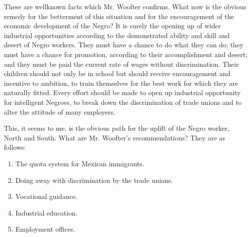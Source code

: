 \documentclass[letterpaper,10pt,english]{jupyterBook}
\begin{document}
\sphinxAtStartPar
These are well\sphinxhyphen{}known facts which Mr. Woofter confirms. What now is the obvious remedy for the betterment of this situation and for the encouragement of the economic development of the Negro? It is surely the opening up of wider industrial opportunities according to the demonstrated ability and skill and desert of Negro workers. They must have a chance to do what they can do; they must have a chance for promotion, according to their accomplishment and desert; and they must be paid the current rate of wages without discrimination. Their children should not only be in school but should receive encouragement and incentive to ambition, to train themselves for the best work for which they are naturally fitted. Every effort should be made to open up industrial opportunity for intelligent Negroes, to break down the discrimination of trade unions and to alter the attitude of many employers.

\sphinxAtStartPar
This, it seems to me, is the obvious path for the uplift of the Negro worker, North and South. What are Mr. Woofter’s recommendations? They are as follows:
\begin{enumerate}
%
\item {} 
\sphinxAtStartPar
The quota system for Mexican immigrants.

\item {} 
\sphinxAtStartPar
Doing away with discrimination by the trade unions.

\item {} 
\sphinxAtStartPar
Vocational guidance.

\item {} 
\sphinxAtStartPar
Industrial education.

\item {} 
\sphinxAtStartPar
Employment offices.

\end{enumerate}
\end{document}
